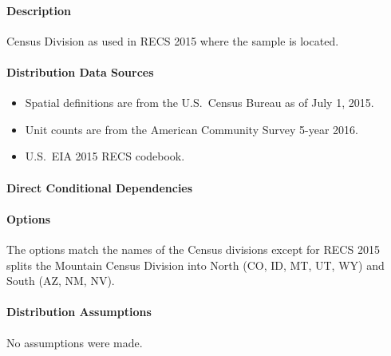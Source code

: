 \paragraph{Description}
% 
Census Division as used in RECS 2015 where the sample is located.

\paragraph{Distribution Data Sources}
% 
\begin{itemize}
    \item Spatial definitions are from the U.S.~Census Bureau as of July 1, 2015.
    \item Unit counts are from the American Community Survey 5-year 2016.
    \item U.S.~EIA 2015 RECS codebook.
\end{itemize}

\paragraph{Direct Conditional Dependencies}


\paragraph{Options}
The options match the names of the Census divisions except for RECS 2015 splits the Mountain Census Division into North (CO, ID, MT, UT, WY) and South (AZ, NM, NV).

\paragraph{Distribution Assumptions}
% 
No assumptions were made.
